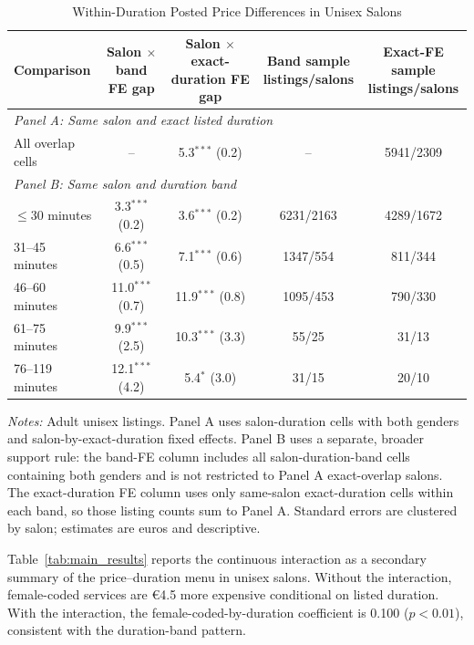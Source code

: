 \documentclass[12pt,a4paper]{article}
\begin{document}
\begin{table}[htbp]
  \centering
  \caption{Within-Duration Posted Price Differences in Unisex Salons}
  \label{tab:within_duration_gaps}
  \footnotesize
\begin{tabular}{lcccc}
\hline
Comparison & \makecell{Salon $\times$ band\\FE gap} & \makecell{Salon $\times$ exact-\\duration FE gap} & \makecell{Band sample\\listings/salons} & \makecell{Exact-FE sample\\listings/salons} \\
\hline
\multicolumn{5}{l}{\textit{Panel A: Same salon and exact listed duration}} \\
All overlap cells & -- & 5.3$^{***}$ (0.2) & -- & 5941/2309 \\
\hline
\multicolumn{5}{l}{\textit{Panel B: Same salon and duration band}} \\
$\leq$30 minutes & 3.3$^{***}$ (0.2) & 3.6$^{***}$ (0.2) & 6231/2163 & 4289/1672 \\
31--45 minutes & 6.6$^{***}$ (0.5) & 7.1$^{***}$ (0.6) & 1347/554 & 811/344 \\
46--60 minutes & 11.0$^{***}$ (0.7) & 11.9$^{***}$ (0.8) & 1095/453 & 790/330 \\
61--75 minutes & 9.9$^{***}$ (2.5) & 10.3$^{***}$ (3.3) & 55/25 & 31/13 \\
76--119 minutes & 12.1$^{***}$ (4.2) & 5.4$^{*}$ (3.0) & 31/15 & 20/10 \\
\hline
\end{tabular}

\begin{minipage}{0.94\linewidth}
\footnotesize
\textit{Notes:} Adult unisex listings.
Panel A uses salon-duration cells with both genders and salon-by-exact-duration fixed effects.
Panel B uses a separate, broader support rule: the band-FE column includes all salon-duration-band cells containing both genders and is not restricted to Panel A exact-overlap salons.
The exact-duration FE column uses only same-salon exact-duration cells within each band, so those listing counts sum to Panel A.
Standard errors are clustered by salon; estimates are euros and descriptive.
\end{minipage}
\end{table}

Table~\ref{tab:main_results} reports the continuous interaction as a secondary summary of the price--duration menu in unisex salons. Without the interaction, female-coded services are €4.5 more expensive conditional on listed duration. With the interaction, the female-coded-by-duration coefficient is 0.100 ($p < 0.01$), consistent with the duration-band pattern.
\end{document}
